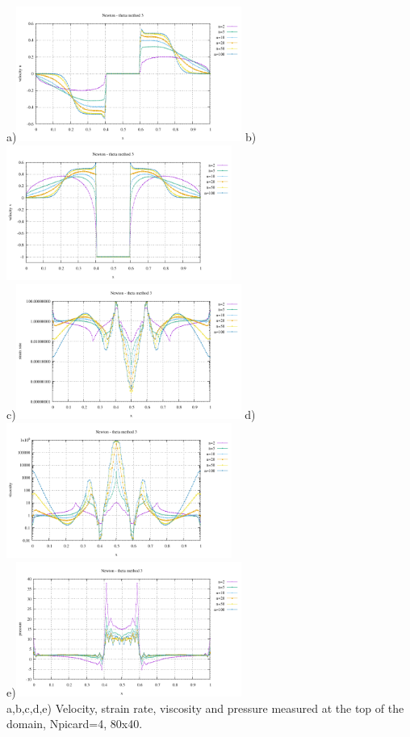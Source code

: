 \begin{center}
a)\includegraphics[width=7.38cm]{python_codes/fieldstone_87/results/experiment_09/surface_profile_u_meth3.pdf}
b)\includegraphics[width=7.38cm]{python_codes/fieldstone_87/results/experiment_09/surface_profile_v_meth3.pdf}\\
c)\includegraphics[width=7.38cm]{python_codes/fieldstone_87/results/experiment_09/surface_profile_sr_meth3.pdf}
d)\includegraphics[width=7.38cm]{python_codes/fieldstone_87/results/experiment_09/surface_profile_eta_meth3.pdf}\\
e)\includegraphics[width=7.38cm]{python_codes/fieldstone_87/results/experiment_09/surface_profile_p_meth3.pdf}\\
{\captionfont a,b,c,d,e) Velocity, strain rate, viscosity and pressure measured at the top of the domain, 
Npicard=4, 80x40.}
\end{center}

